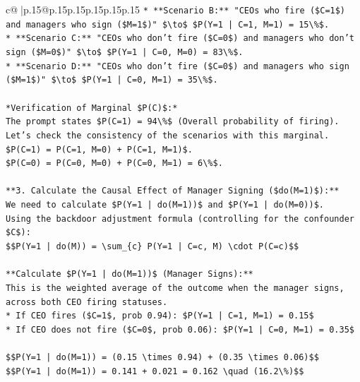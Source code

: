 \documentclass{article}
\begin{document}
{\begin{supertabular}{c@{$\;$}|p{.15\linewidth}@{}p{.15\linewidth}p{.15\linewidth}p{.15\linewidth}p{.15\linewidth}p{.15\linewidth}}
{{{\texttt{*   **Scenario B:** "CEOs who fire (\$C=1\$) and managers who sign (\$M=1\$)" \$\textbackslash{}to\$ \$P(Y=1 | C=1, M=1) = 15\textbackslash{}\%\$.} \\
\texttt{*   **Scenario C:** "CEOs who don't fire (\$C=0\$) and managers who don't sign (\$M=0\$)" \$\textbackslash{}to\$ \$P(Y=1 | C=0, M=0) = 83\textbackslash{}\%\$.} \\
\texttt{*   **Scenario D:** "CEOs who don't fire (\$C=0\$) and managers who sign (\$M=1\$)" \$\textbackslash{}to\$ \$P(Y=1 | C=0, M=1) = 35\textbackslash{}\%\$.} \\
\\ 
\texttt{*Verification of Marginal \$P(C)\$:*} \\
\texttt{The prompt states \$P(C=1) = 94\textbackslash{}\%\$ (Overall probability of firing).} \\
\texttt{Let's check the consistency of the scenarios with this marginal.} \\
\texttt{\$P(C=1) = P(C=1, M=0) + P(C=1, M=1)\$.} \\
\texttt{\$P(C=0) = P(C=0, M=0) + P(C=0, M=1) = 6\textbackslash{}\%\$.} \\
\\ 
\texttt{**3. Calculate the Causal Effect of Manager Signing (\$do(M=1)\$):**} \\
\texttt{We need to calculate \$P(Y=1 | do(M=1))\$ and \$P(Y=1 | do(M=0))\$.} \\
\texttt{Using the backdoor adjustment formula (controlling for the confounder \$C\$):} \\
\texttt{\$\$P(Y=1 | do(M)) = \textbackslash{}sum\_\{c\} P(Y=1 | C=c, M) \textbackslash{}cdot P(C=c)\$\$} \\
\\ 
\texttt{**Calculate \$P(Y=1 | do(M=1))\$ (Manager Signs):**} \\
\texttt{This is the weighted average of the outcome when the manager signs, across both CEO firing statuses.} \\
\texttt{*   If CEO fires (\$C=1\$, prob 0.94): \$P(Y=1 | C=1, M=1) = 0.15\$} \\
\texttt{*   If CEO does not fire (\$C=0\$, prob 0.06): \$P(Y=1 | C=0, M=1) = 0.35\$} \\
\\ 
\texttt{\$\$P(Y=1 | do(M=1)) = (0.15 \textbackslash{}times 0.94) + (0.35 \textbackslash{}times 0.06)\$\$} \\
\texttt{\$\$P(Y=1 | do(M=1)) = 0.141 + 0.021 = 0.162 \textbackslash{}quad (16.2\textbackslash{}\%)\$\$} \\
}}}
\end{supertabular}}
\end{document}
